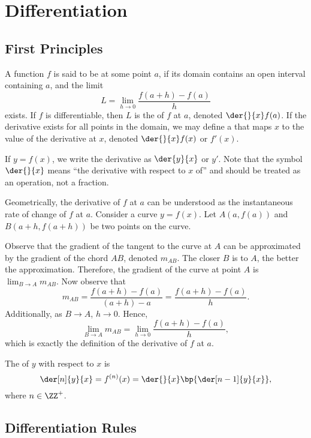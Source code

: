 \chapter{Differentiation}

\section{First Principles}

\begin{definition}
    A function $f$ is said to be  at some point $a$, if its domain contains an open interval containing $a$, and the limit \[L = \lim_{h \to 0} \frac{f(a+h) - f(a)}{h}\] exists. If $f$ is differentiable, then $L$ is the  of $f$ at $a$, denoted $\der{}{x} f(a)$. If the derivative exists for all points in the domain, we may define a  that maps $x$ to the value of the derivative at $x$, denoted $\der{}{x} f(x)$ or $f'(x)$.
\end{definition}

If $y = f(x)$, we write the derivative as $\der{y}{x}$ or $y'$. Note that the symbol $\der{}{x}$ means ``the derivative with respect to $x$ of'' and should be treated as an operation, not a fraction.

Geometrically, the derivative of $f$ at $a$ can be understood as the instantaneous rate of change of $f$ at $a$. Consider a curve $y = f(x)$. Let $A(a, f(a))$ and $B(a + h, f(a + h))$ be two points on the curve.

Observe that the gradient of the tangent to the curve at $A$ can be approximated by the gradient of the chord $AB$, denoted $m_{AB}$. The closer $B$ is to $A$, the better the approximation. Therefore, the gradient of the curve at point $A$ is $\lim_{B \to A} m_{AB}$. Now observe that \[m_{AB} = \frac{f(a + h) - f(a)}{(a + h) - a} = \frac{f(a + h) - f(a)}{h}.\] Additionally, as $B \to A$, $h \to 0$. Hence, \[\lim_{B \to A} m_{AB} = \lim_{h \to 0} \frac{f(a + h) - f(a)}{h},\] which is exactly the definition of the derivative of $f$ at $a$.

\begin{definition}
    The  of $y$ with respect to $x$ is \[\der[n]{y}{x} = f^{(n)}(x) = \der{}{x} \bp{\der[n-1]{y}{x}},\] where $n \in \ZZ^+$.
\end{definition}

\section{Differentiation Rules}

